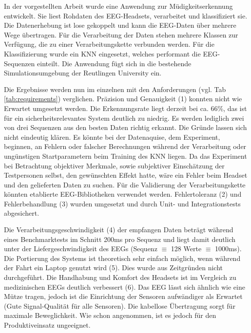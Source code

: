 \label{chap:result}
In der vorgestellten Arbeit wurde eine Anwendung zur Müdigkeitserkennung entwickelt. Sie liest Rohdaten des EEG-Headsets, verarbeitet und klassifiziert sie. Die Datenerhebung ist lose gekoppelt und kann die EEG-Daten über mehrere Wege übertragen. Für die Verarbeitung der Daten stehen mehrere Klassen zur Verfügung, die zu einer Verarbeitungskette verbunden werden. Für die Klassifizierung wurde ein KNN eingesetzt, welches performant die EEG-Sequenzen einteilt. Die Anwendung fügt sich in die bestehende Simulationsumgebung der Reutlingen University ein.

Die Ergebnisse werden nun im einzelnen mit den Anforderungen (vgl. Tab \ref{tab:requirements}) verglichen.
Präzision und Genauigkeit (1) konnten nicht wie Erwartet umgesetzt werden. Die Erkennungsrate liegt derzeit bei ca. 66\%, das ist für ein sicherheitsrelevantes System deutlich zu niedrig. Es werden lediglich zwei von drei Sequenzen aus den besten Daten richtig erkannt. Die Gründe lassen sich nicht eindeutig klären. Es könnte bei der Datenaquise, dem Experiment, beginnen, an Fehlern oder falscher Berechnungen während der Verarbeitung oder ungünstigen Startparametern beim Training des KNN liegen. Da das Experiment bei Betrachtung objektiver Merkmale, sowie subjektiver Einschätzung der  Testpersonen selbst, den gewünschten Effekt hatte, wäre ein Fehler beim Headset und den gelieferten Daten zu suchen. Für die Validierung der Verarbeitungskette könnten etablierte EEG-Bibliotheken verwendet werden.
Fehlertoleranz (2) und Fehlerbehandlung (3) wurden umgesetzt und durch Unit- und Integrationstests abgesichert. 

Die Verarbeitungsgeschwindigkeit (4) der empfangen Daten beträgt  während eines Benchmarktests im Schnitt 200ms pro Sequenz und liegt damit deutlich unter der Liefergeschwindigkeit des EEGs (Sequenz $\equiv$ 128 Werte $\equiv$ 1000ms). 
Die Portierung des Systems ist theoretisch sehr einfach möglich, wenn während der Fahrt ein Laptop genutzt wird (5). Dies wurde aus Zeitgründen nicht durchgeführt. Die Handhabung und Komfort des Headsets ist im Vergleich zu medizinischen EEGs deutlich verbessert (6). Das EEG lässt sich ähnlich wie eine Mütze tragen, jedoch ist die Einrichtung der Sensoren aufwändiger als Erwartet (Gute Signal-Qualität für alle Sensoren). Die kabellose Übertragung sorgt für maximale Beweglichkeit. Wie schon angenommen, ist es jedoch für den Produktiveinsatz ungeeignet.

